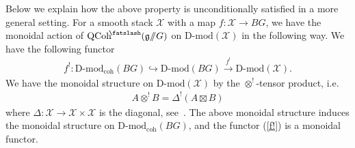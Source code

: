 \documentclass [11pt,oneside,a4paper,mathscr]{amsart}
\theoremstyle{definition}
\newcommand{\QCoh}{\operatorname{QCoh}}
\newcommand{\X}{\mathcal{X}}
\newcommand{\shear}{{\mathbin{\mkern-6mu\fatslash}}}
\newcommand{\ssslash}{/\!\!/}
\begin{document}
Below we explain how the above property is unconditionally satisfied 
in a more general setting. For a smooth stack $\mathcal{X}$ with a map 
$f\colon \mathcal{X}\to BG$, we have the monoidal action of
$\QCoh^{\shear}(\mathfrak{g}\ssslash G)$ on $\text{D-mod}(\X)$ in the following way. 
We have the following functor 
\begin{align}\label{f!}
    f^! \colon \text{D-mod}_{\mathrm{coh}}(BG) \hookrightarrow \text{D-mod}(BG)
    \stackrel{f^!}{\to} \text{D-mod}(\mathcal{X}). 
\end{align}
We have the monoidal structure on 
$\text{D-mod}(\mathcal{X})$ by the $\otimes^!$-tensor product, i.e. 
\begin{align*}
    A \otimes^! B=\Delta^!(A\boxtimes B)
\end{align*}
where $\Delta \colon \X\to \mathcal{X} \times \mathcal{X}$ is the diagonal, 
see~\cite[Section~5.1.5]{MR3037900}. 
The above monoidal structure induces the monoidal structure on 
$\text{D-mod}_{\mathrm{coh}}(BG)$, and the functor (\ref{f!}) is a monoidal functor. 
\end{document}

